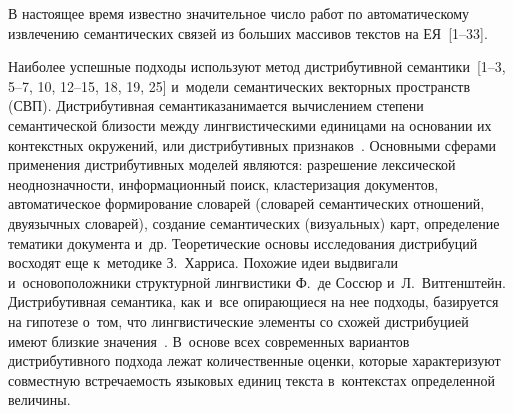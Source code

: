 \begin{multicols}{2}
     В настоящее время известно значительное чис\-ло работ по
автоматическому извлечению семантических связей из больших массивов
текстов на ЕЯ~[1--33].

Наиболее успешные подходы
используют метод дистрибутивной семантики~[1--3, 5--7, 10, 12--15, 18, 19, 25] и~модели семантических векторных
пространств (СВП). Дистрибутивная семантика\linebreak занимает\-ся вычислением
степени семантической близости между лингвистическими %
 единицами на\linebreak
основании их контекстных окружений, или дистрибутивных
признаков~\cite{17-koz, 18-koz, 19-koz}. Основными сферами применения
дистрибутивных моделей являются: разрешение лексической
неоднознач\-ности,\linebreak
 информационный поиск, клас\-те\-ри\-за\-ция документов,
автоматическое фор\-ми\-рование словарей (словарей семантических
\mbox{отношений}, двуязычных словарей), создание семантических (визуальных)
карт, определение тематики документа и~др. Теоретические основы
исследования дистрибуций восходят еще к~методике З.~Харриса. Похожие
идеи выдвигали и~основоположники структурной лингвистики Ф.~де Соссюр
и~Л.~Витгенштейн. Дистрибутивная семантика, как и~все опирающиеся на
нее подходы, базируется на гипотезе о~том, что лингвистические элементы со
схожей дистрибуцией имеют близкие значения~\cite{23-koz, 24-koz}.
В~основе всех современных вариантов дистрибутивного подхода лежат
количественные оценки, которые характеризуют совместную встречаемость
языковых единиц текста в~контекстах определенной величины.


\end{multicols}
